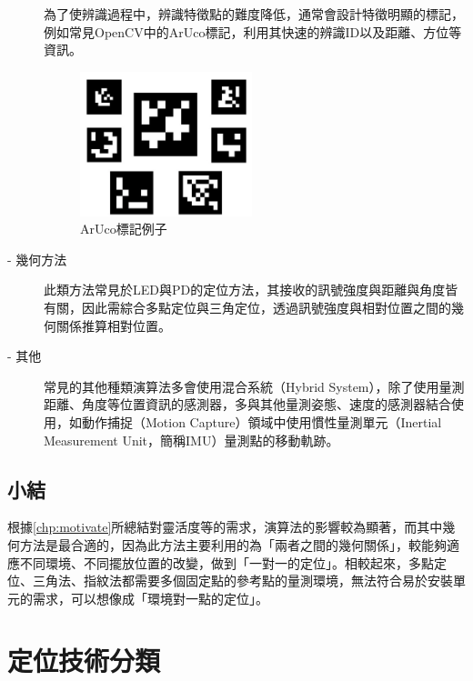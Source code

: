\begin{description}
        \qquad
        為了使辨識過程中，辨識特徵點的難度降低，通常會設計特徵明顯的標記，例如常見OpenCV中的ArUco標記，利用其快速的辨識ID以及距離、方位等資訊。
        
        \begin{figure}[ht]
            \centering
            \includegraphics[width=5cm]{ch2pic/aruco.png}
            \caption{ArUco標記例子\cite{pic:aruco}}
            \label{pic:aruco}
        \end{figure}
        
        \item[- 幾何方法] \hfill 
        
        \qquad
        此類方法常見於LED與PD的定位方法，其接收的訊號強度與距離與角度皆有關，因此需綜合多點定位與三角定位，透過訊號強度與相對位置之間的幾何關係推算相對位置。
        
        \item[- 其他]\hfill 
        
        \qquad
        常見的其他種類演算法多會使用混合系統（Hybrid System），除了使用量測距離、角度等位置資訊的感測器，多與其他量測姿態、速度的感測器結合使用，如動作捕捉（Motion Capture）領域中使用慣性量測單元（Inertial Measurement Unit，簡稱IMU）量測點的移動軌跡。

    \end{description}

    \subsection{小結}

    根據\ref{chp:motivate}所總結對靈活度等的需求，演算法的影響較為顯著，而其中幾何方法是最合適的，因為此方法主要利用的為「兩者之間的幾何關係」，較能夠適應不同環境、不同擺放位置的改變，做到「一對一的定位」。相較起來，多點定位、三角法、指紋法都需要多個固定點的參考點的量測環境，無法符合易於安裝單元的需求，可以想像成「環境對一點的定位」。



\section{定位技術分類}
\label{chp:technique}

